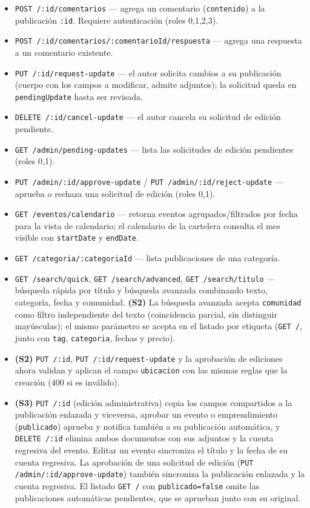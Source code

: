\begin{itemize}
    \item \texttt{POST /:id/comentarios} — agrega un comentario (\texttt{contenido}) a la publicación \texttt{:id}. Requiere autenticación (roles 0,1,2,3).
    \item \texttt{POST /:id/comentarios/:comentarioId/respuesta} — agrega una respuesta a un comentario existente.
    \item \texttt{PUT /:id/request-update} — el autor solicita cambios a su publicación (cuerpo con los campos a modificar, admite adjuntos); la solicitud queda en \texttt{pendingUpdate} hasta ser revisada.
    \item \texttt{DELETE /:id/cancel-update} — el autor cancela su solicitud de edición pendiente.
    \item \texttt{GET /admin/pending-updates} — lista las solicitudes de edición pendientes (roles 0,1).
    \item \texttt{PUT /admin/:id/approve-update} / \texttt{PUT /admin/:id/reject-update} — aprueba o rechaza una solicitud de edición (roles 0,1).
    \item \texttt{GET /eventos/calendario} — retorna eventos agrupados/filtrados por fecha para la vista de calendario; el calendario de la cartelera consulta el mes visible con \texttt{startDate} y \texttt{endDate}.
    \item \texttt{GET /categoria/:categoriaId} — lista publicaciones de una categoría.
    \item \texttt{GET /search/quick}, \texttt{GET /search/advanced}, \texttt{GET /search/titulo} — búsqueda rápida por título y búsqueda avanzada combinando texto, categoría, fecha y comunidad. \textbf{(S2)} La búsqueda avanzada acepta \texttt{comunidad} como filtro independiente del texto (coincidencia parcial, sin distinguir mayúsculas); el mismo parámetro se acepta en el listado por etiqueta (\texttt{GET /}, junto con \texttt{tag}, \texttt{categoria}, fechas y precio).
    \item \textbf{(S2)} \texttt{PUT /:id}, \texttt{PUT /:id/request-update} y la aprobación de ediciones ahora validan y aplican el campo \texttt{ubicacion} con las mismas reglas que la creación (400 si es inválido).
    \item \textbf{(S3)} \texttt{PUT /:id} (edición administrativa) copia los campos compartidos a la publicación enlazada y viceversa, aprobar un evento o emprendimiento (\texttt{publicado}) aprueba y notifica también a su publicación automática, y \texttt{DELETE /:id} elimina ambos documentos con sus adjuntos y la cuenta regresiva del evento. Editar un evento sincroniza el título y la fecha de su cuenta regresiva. La aprobación de una solicitud de edición (\texttt{PUT /admin/:id/approve-update}) también sincroniza la publicación enlazada y la cuenta regresiva. El listado \texttt{GET /} con \texttt{publicado=false} omite las publicaciones automáticas pendientes, que se aprueban junto con su original.
\end{itemize}

